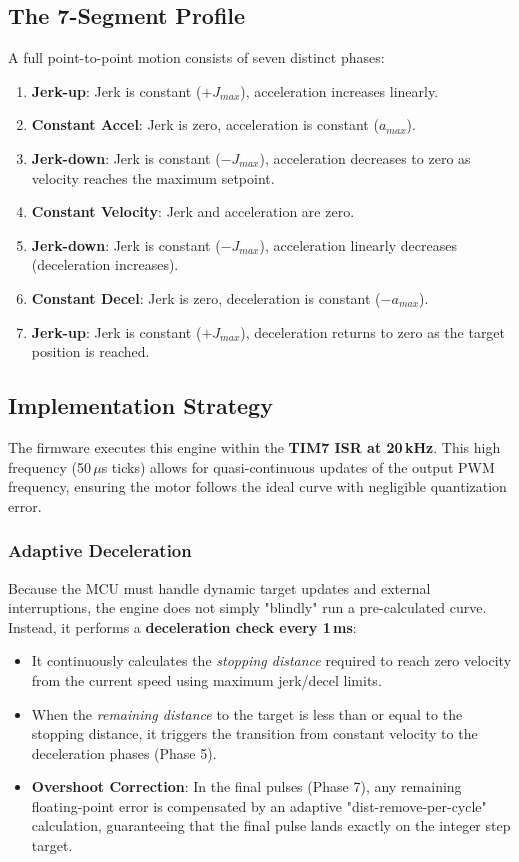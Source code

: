 \documentclass[12pt,a4paper]{report}
\begin{document}
\subsection{The 7-Segment Profile}

A full point-to-point motion consists of seven distinct phases:

\begin{enumerate}
    \item \textbf{Jerk-up}: Jerk is constant ($+J_{max}$), acceleration increases linearly.
    \item \textbf{Constant Accel}: Jerk is zero, acceleration is constant ($a_{max}$).
    \item \textbf{Jerk-down}: Jerk is constant ($-J_{max}$), acceleration decreases to zero as velocity reaches the maximum setpoint.
    \item \textbf{Constant Velocity}: Jerk and acceleration are zero.
    \item \textbf{Jerk-down}: Jerk is constant ($-J_{max}$), acceleration linearly decreases (deceleration increases).
    \item \textbf{Constant Decel}: Jerk is zero, deceleration is constant ($-a_{max}$).
    \item \textbf{Jerk-up}: Jerk is constant ($+J_{max}$), deceleration returns to zero as the target position is reached.
\end{enumerate}

\subsection{Implementation Strategy}

The firmware executes this engine within the \textbf{TIM7 ISR at 20\,kHz}. This high frequency (50\,$\mu$s ticks) allows for quasi-continuous updates of the output PWM frequency, ensuring the motor follows the ideal curve with negligible quantization error.

\subsubsection{Adaptive Deceleration}
Because the MCU must handle dynamic target updates and external interruptions, the engine does not simply "blindly" run a pre-calculated curve. Instead, it performs a \textbf{deceleration check every 1\,ms}:
\begin{itemize}
    \item It continuously calculates the \textit{stopping distance} required to reach zero velocity from the current speed using maximum jerk/decel limits.
    \item When the \textit{remaining distance} to the target is less than or equal to the stopping distance, it triggers the transition from constant velocity to the deceleration phases (Phase 5).
    \item \textbf{Overshoot Correction}: In the final pulses (Phase 7), any remaining floating-point error is compensated by an adaptive "dist-remove-per-cycle" calculation, guaranteeing that the final pulse lands exactly on the integer step target.
\end{itemize}
\end{document}
